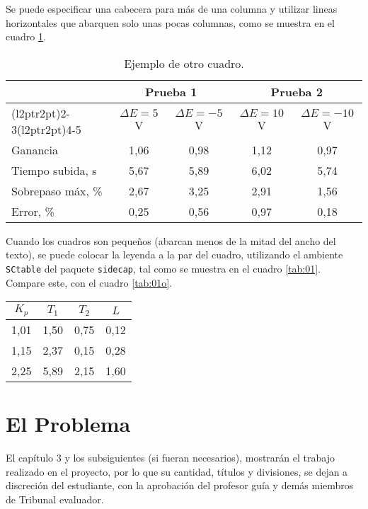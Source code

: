 Se puede especificar una cabecera para más de una columna y utilizar lineas horizontales que abarquen solo unas pocas columnas, como se muestra en el cuadro \ref{tab:muestra}.

\begin{table}
\caption{Ejemplo de otro cuadro.} \label{tab:muestra}
	\begin{tabular}{@{}l*{4}{c}@{}}
	\toprule
	& \multicolumn{2}{c}{Prueba 1} & \multicolumn{2}{c}{Prueba 2} \\
	\cmidrule(l{2pt}r{2pt}){2-3}\cmidrule(l{2pt}r{2pt}){4-5} 
	& $\Delta E=5$ V & $\Delta E = -5$ V & $\Delta E = 10$ V & $\Delta E = -10$ V \\
	\midrule
	Ganancia             &  1,06 & 0,98 & 1,12 & 0,97 \\
	Tiempo subida, s  &  5,67 & 5,89 & 6,02 & 5,74 \\
	Sobrepaso máx, \%        &  2,67 & 3,25 & 2,91 & 1,56 \\
	Error, \% &  0,25 & 0,56 & 0,97 & 0,18 \\
	\bottomrule
	\end{tabular}
\end{table}

\newpage
Cuando los cuadros son pequeños (abarcan menos de la mitad del ancho del texto), se puede colocar la leyenda a la par del cuadro, utilizando el ambiente \texttt{SCtable} del paquete \texttt{sidecap}, tal como se muestra en el cuadro \ref{tab:01}.  Compare este, con el cuadro \ref{tab:01o}.

\begin{SCtable}
\caption[Parámetros de los modelos]{Parámetros de los modelos, obtenidos a partir de las tres curvas de reacción.} \label{tab:01}
    \begin{tabular}{@{}*{4}{c}@{}}
    \toprule
    $K_p$ & $T_1$ & $T_2$ & $L$ \\
    \midrule
     1,01 & 1,50 & 0,75 & 0,12 \\
		 1,15 & 2,37 & 0,15 & 0,28 \\
		 2,25 & 5,89 & 2,15 & 1,60 \\
    \bottomrule
    \end{tabular}
\end{SCtable}

\chapter{El Problema}
El capítulo 3 y los subsiguientes (si fueran necesarios), mostrarán el trabajo realizado en el proyecto, por lo que su cantidad, títulos y divisiones, se dejan a discreción del estudiante, con la aprobación del profesor guía y demás miembros de Tribunal evaluador.

